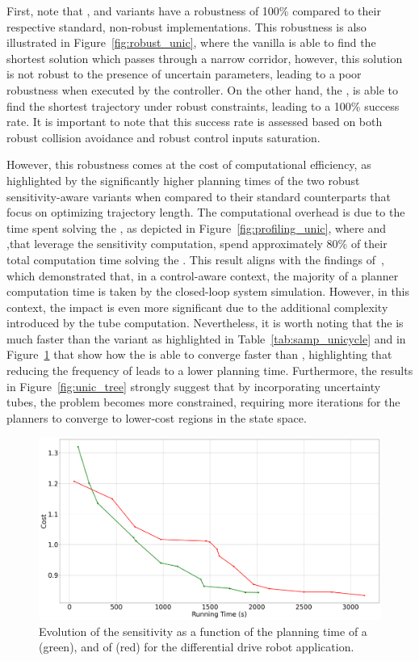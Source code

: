 First, note that , and  variants have a robustness of 100\% compared to their respective standard, non-robust implementations.
This robustness is also illustrated in Figure~\ref{fig:robust_unic}, where the vanilla  is able to find the shortest solution which passes through a narrow corridor, however, this solution is not robust to the presence of uncertain parameters, leading to a poor robustness when executed by the controller.
On the other hand, the , is able to find the shortest trajectory under robust constraints, leading to a 100\% success rate.
It is important to note that this success rate is assessed based on both robust collision avoidance and robust control inputs saturation.

However, this robustness comes at the cost of computational efficiency, as highlighted by the significantly higher planning times of the two robust sensitivity-aware variants when compared to their standard counterparts that focus on optimizing trajectory length.
The computational overhead is due to the time spent solving the , as depicted in Figure~\ref{fig:profiling_unic}, where  and  ,that leverage the sensitivity computation, spend approximately 80\% of their total computation time solving the . 
This result aligns with the findings of~\cite{cTognon}, which demonstrated that, in a control-aware context, the majority of a planner computation time is taken by the closed-loop system simulation.
However, in this context, the impact is even more significant due to the additional complexity introduced by the tube computation.
Nevertheless, it is worth noting that the  is much faster than the  variant as highlighted in Table~\ref{tab:samp_unicycle} and in Figure~\ref{fig:samp_unic_time} that show how the  is able to converge faster than , highlighting that reducing the frequency of  leads to a lower planning time.
Furthermore, the results in Figure~\ref{fig:unic_tree} strongly suggest that by incorporating uncertainty tubes, the problem becomes more constrained, requiring more iterations for the planners to converge to lower-cost regions in the state space.

\begin{figure} [H]
    \centering
    \includegraphics[width=0.7\linewidth]{figures/samp/unicycle_cost_conv.png} 
    \caption{Evolution of the sensitivity as a function of the planning time of a  (green), and of  (red) for the differential drive robot application.}%
    \label{fig:samp_unic_time}%
\end{figure}

